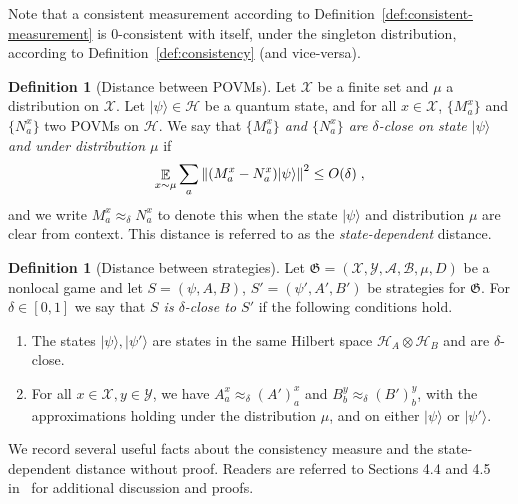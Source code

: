 \documentclass{book}
\theoremstyle{plain}
\theoremstyle{definition}
\newtheorem{definition}[subsection]{Definition}
\theoremstyle{remark}
\numberwithin{equation}{subsection}
\newcommand{\cal}[1]{\mathcal{#1}}
\newcommand{\mH}{\mathcal{H}}
\newcommand{\mX}{\mathcal{X}}
\newcommand{\E}{\mathop{\mathbb{E}}\displaylimits} %
\newcommand{\norm}[1]{\left\| {#1} \right\|}
\newcommand{\ket}[1]{|#1\rangle}
\newcommand{\game}{\mathfrak{G}}
\newcommand{\strategy}{{S}}
\begin{document}
Note that a consistent measurement according to
Definition~\ref{def:consistent-measurement} is $0$-consistent with itself, under
the singleton distribution, according to Definition~\ref{def:consistency} (and
vice-versa).

\begin{definition}[Distance between POVMs]
  \label{def:povm-distance}
	Let $\mX$ be a finite set and $\mu$ a distribution on $\mX$. 
  Let $\ket{\psi} \in \cal{H}$ be a quantum state, and for all $x\in \mX$,
  $\{M^x_a\}$ and $\{N^x_a\}$ two POVMs on $\mH$.
  We say that \emph{$\{M^x_a\}$ and $\{N^x_a\}$ are $\delta$-close on state
    $\ket{\psi}$ and under distribution $\mu$} if
  \begin{equation*}
    \E_{x\sim \mu} \sum_a \norm{ (M^x_a - N^x_a) \ket{\psi} }^2 \leq O(\delta)\;,
  \end{equation*}
  and we write $M^x_a \approx_\delta N^x_a$ to denote this when the state
  $\ket{\psi}$ and distribution $\mu$ are clear from context.
  This distance is referred to as the \emph{state-dependent} distance.
\end{definition}

\begin{definition}[Distance between strategies]
  \label{def:strategy-distance}
  Let $\game = (\cal{X}, \cal{Y}, \cal{A}, \cal{B}, \mu, D)$ be a nonlocal game
  and let $\strategy = (\psi, A, B)$, $\strategy' = (\psi', A', B')$ be 
  strategies for $\game$.
  For $\delta\in[0,1]$ we say that \emph{$\strategy$ is $\delta$-close to
    $\strategy'$} if the following conditions hold.
  \begin{enumerate}
	\item The states $\ket{\psi}, \ket{\psi'}$ are states in the same
    Hilbert space $\mH_A \otimes \mH_B$ and are $\delta$-close.
	\item For all $x \in \cal{X}, y \in \cal{Y}$, we have $A^x_a \approx_\delta
    (A')^x_a$ and $B^y_b \approx_\delta (B')^y_b$, with the approximations
    holding under the distribution $\mu$, and on either $\ket{\psi}$ or
    $\ket{\psi'}$.
  \end{enumerate}
\end{definition}

We record several useful facts about the consistency measure and the
state-dependent distance without proof.
Readers are referred to Sections 4.4 and 4.5 in~\cite{NW19} for additional
discussion and proofs.
\end{document}
